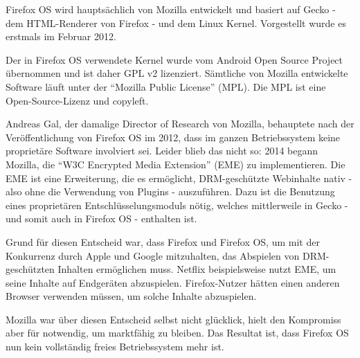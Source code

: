 Firefox OS wird hauptsächlich von Mozilla entwickelt und basiert auf Gecko - dem HTML-Renderer von Firefox - und dem Linux Kernel\cite{online:ff-architecture}. Vorgestellt wurde es erstmals im Februar 2012\cite{online:ff-techhive-b2g}.

Der in Firefox OS verwendete Kernel wurde vom Android Open Source Project übernommen und ist daher GPL v2 lizenziert\cite{online:kernel-license}. Sämtliche von Mozilla entwickelte Software läuft unter der ``Mozilla Public License'' (MPL)\cite{online:mozilla-licensing}. Die MPL ist eine Open-Source-Lizenz und copyleft\cite{online:mpl}.

Andreas Gal, der damalige Director of Research von Mozilla, behauptete nach der Veröffentlichung von Firefox OS im 2012, dass im ganzen Betriebssystem keine proprietäre Software involviert sei\cite{online:knowyourmobile-b2g}. Leider blieb das nicht so: 2014 begann Mozilla, die ``W3C Encrypted Media Extension'' (EME) zu implementieren\cite{online:mozilla-eme}. Die EME  ist eine Erweiterung, die es ermöglicht, DRM-geschützte Webinhalte nativ - also ohne die Verwendung von Plugins - auszuführen. Dazu ist die Benutzung eines proprietären Entschlüsselungsmoduls nötig\cite{online:mozilla-eme}, welches mittlerweile in Gecko - und somit auch in Firefox OS - enthalten ist.

Grund für diesen Entscheid war, dass Firefox und Firefox OS, um mit der Konkurrenz durch Apple und Google mitzuhalten, das Abspielen von DRM-geschützten Inhalten ermöglichen muss. Netflix beispielsweise nutzt EME, um seine Inhalte auf Endgeräten abzuspielen. Firefox-Nutzer hätten einen anderen Browser verwenden müssen, um solche Inhalte abzuspielen\cite{online:mozilla-eme}.

Mozilla war über diesen Entscheid selbst nicht glücklick\cite{online:ff-drm-implementation}, hielt den Kompromiss aber für notwendig, um marktfähig zu bleiben. Das Resultat ist, dass Firefox OS nun kein vollständig freies Betriebssystem mehr ist. \\




